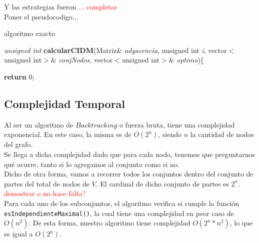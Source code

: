 Y las estrategias fueron \textcolor{red}{... completar}\\

Poner el pseudocodigo...

\begin{algorithm}[h!]
\caption{algoritmo exacto}

\textit{unsigned int} \textbf{calcularCIDM}(Matriz\& \textit{adyacencia}, unsigned int \textit{i}, vector$<$unsigned int$>$\& \textit{conjNodos}, vector$<$unsigned int$>$\& \textit{optimo})\{ 
\newline

\textbf{return} 0;
\end{algorithm}

\subsection{Complejidad Temporal}
Al ser un algoritmo de $Backtracking$ o fuerza bruta, tiene una complejidad exponencial. En este caso, la misma es de $O(2^n)$, siendo $n$ la cantidad de nodos del grafo. \\

Se llega a dicha complejidad dado que para cada nodo, tenemos que preguntarnos qu\'e ocurre, tanto si lo agregamos al conjunto como si no.\\

Dicho de otra forma, vamos a recorrer todos los conjuntos dentro del conjunto de partes del total de nodos de $V$. El cardinal de dicho conjunto de partes es $2^n$. \textcolor{red}{demostrar o no hace falta?}\\

Para cada uno de los subconjuntos, el algoritmo verifica si cumple la funci\'on \texttt{esIndependienteMaximal()}, la cual
tiene una complejidad en peor caso de $O(n^2)$.	De esta forma, nuestro algoritmo tiene complejidad $O(2^n * n^2)$, lo que es igual a $O(2^n)$.\\

